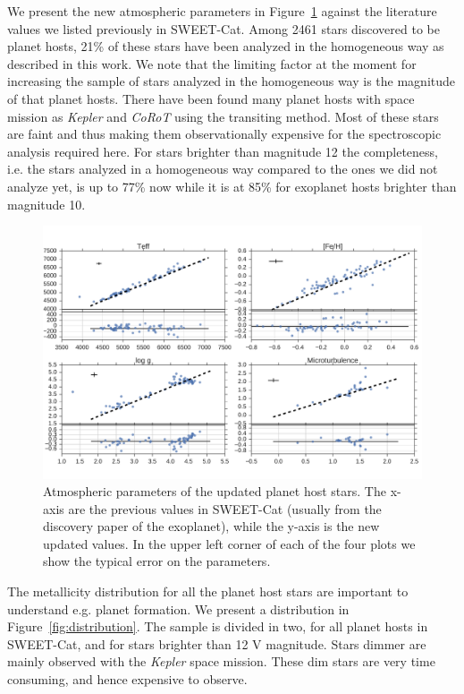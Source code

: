 \documentclass{aa}
\begin{document}
We present the new atmospheric parameters in Figure~\ref{fig:update} against the
literature values we listed previously in SWEET-Cat. Among 2461 stars discovered
to be planet hosts, 21\% of these stars have been analyzed in the homogeneous way as
described in this work. We note that the limiting factor at the moment for
increasing the sample of stars analyzed in the homogeneous way is the magnitude
of that planet hosts. There have been found many planet hosts with space mission
as \emph{Kepler} and \emph{CoRoT} using the transiting method. Most of these
stars are faint and thus making them observationally expensive for the spectroscopic
analysis required here. For stars brighter than magnitude 12 the completeness,
i.e. the stars analyzed in a homogeneous way compared to the ones we did not
analyze yet, is up to 77\% now while it is at 85\% for exoplanet hosts brighter
than magnitude 10.

\begin{figure}[tpb]
    \centering
    \includegraphics[width=1.0\linewidth,natwidth=870,natheight=580]{figures/update.pdf}
    \caption{Atmospheric parameters of the updated planet host stars. The x-axis
    are the previous values in SWEET-Cat (usually from the discovery paper of
    the exoplanet), while the y-axis is the new updated values. In the upper
    left corner of each of the four plots we show the typical error on the
    parameters.}
    \label{fig:update}
\end{figure}

The metallicity distribution for all the planet host stars are important to
understand e.g. planet formation. We present a distribution in
Figure~\ref{fig:distribution}. The sample is divided in two, for all planet
hosts in SWEET-Cat, and for stars brighter than 12 V magnitude. Stars dimmer are
mainly observed with the \emph{Kepler} space mission. These dim stars are very
time consuming, and hence expensive to observe.
\end{document}

